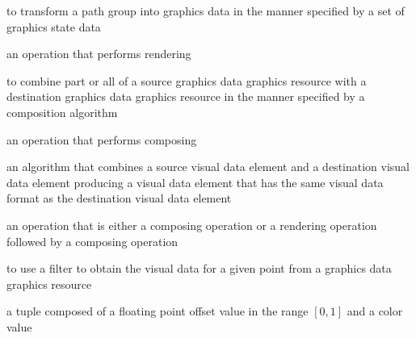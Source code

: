 %
to transform a path group into graphics data in the manner specified by a set of graphics state data

%
an operation that performs rendering

%
to combine part or all of a source graphics data graphics resource with a destination graphics data graphics resource in the manner specified by a composition algorithm

%
an operation that performs composing

%
an algorithm that combines a source visual data element and a destination visual data element producing a visual data element that has the same visual data format as the destination visual data element

%
an operation that is either a composing operation or a rendering operation followed by a composing operation

%
to use a filter to obtain the visual data for a given point from a graphics data graphics resource

%
a tuple composed of a floating point offset value in the range $[0, 1]$ and a color value



%
%

